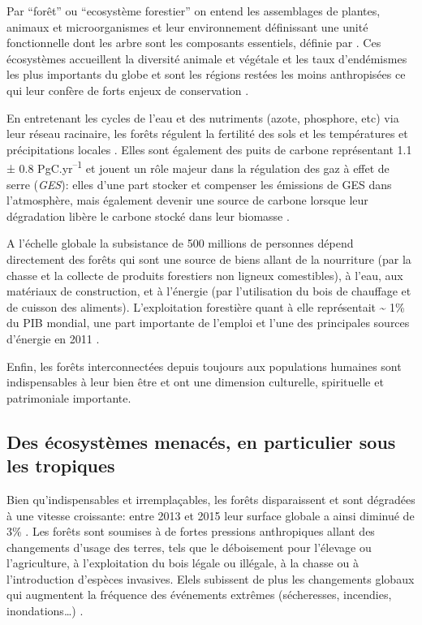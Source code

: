 \documentclass[
  11pt,
  french,
  A4paper,
  extrafontsizes,onecolumn,openright
  ]{memoir}
\begin{document}
Par ``forêt'' ou ``ecosystème forestier'' on entend les assemblages de
plantes, animaux et microorganismes et leur environnement définissant
une unité fonctionnelle dont les arbre sont les composants essentiels,
définie par \autocite{FRA2000}. Ces écosystèmes accueillent la diversité
animale et végétale et les taux d'endémismes les plus importants du
globe et sont les régions restées les moins anthropisées ce qui leur
confère de forts enjeux de conservation
\autocites{Myers2000}{Mittermeier2003}.

En entretenant les cycles de l'eau et des nutriments (azote, phosphore,
etc) via leur réseau racinaire, les forêts régulent la fertilité des
sols et les températures et précipitations locales
\autocites{Malhi2008}{Isbell2017}. Elles sont également des puits de
carbone représentant 1.1 ± 0.8 PgC.yr\textsuperscript{--1} et jouent un
rôle majeur dans la régulation des gaz à effet de serre (\emph{GES}):
elles d'une part stocker et compenser les émissions de GES dans
l'atmosphère, mais également devenir une source de carbone lorsque leur
dégradation libère le carbone stocké dans leur biomasse
\autocites{Pan2011}{Roy2017}.

A l'échelle globale la subsistance de 500 millions de personnes dépend
directement des forêts qui sont une source de biens allant de la
nourriture (par la chasse et la collecte de produits forestiers non
ligneux comestibles), à l'eau, aux matériaux de construction, et à
l'énergie (par l'utilisation du bois de chauffage et de cuisson des
aliments). L'exploitation forestière quant à elle représentait
\textasciitilde{} 1\% du PIB mondial, une part importante de l'emploi et
l'une des principales sources d'énergie en 2011
\autocites{CBDdiversity2011}{FAO2014}.

Enfin, les forêts interconnectées depuis toujours aux populations
humaines sont indispensables à leur bien être et ont une dimension
culturelle, spirituelle et patrimoniale importante.

\subsection{Des écosystèmes menacés, en particulier sous les
tropiques}\label{des-ecosystemes-menaces-en-particulier-sous-les-tropiques}

Bien qu'indispensables et irremplaçables, les forêts disparaissent et
sont dégradées à une vitesse croissante: entre 2013 et 2015 leur surface
globale a ainsi diminué de 3\% \autocite{FAO2009}. Les forêts sont
soumises à de fortes pressions anthropiques allant des changements
d'usage des terres, tels que le déboisement pour l'élevage ou
l'agriculture, à l'exploitation du bois légale ou illégale, à la chasse
ou à l'introduction d'espèces invasives. Elels subissent de plus les
changements globaux qui augmentent la fréquence des événements extrêmes
(sécheresses, incendies, inondations\ldots{}) \autocite{Pachauri2014}.
\end{document}
